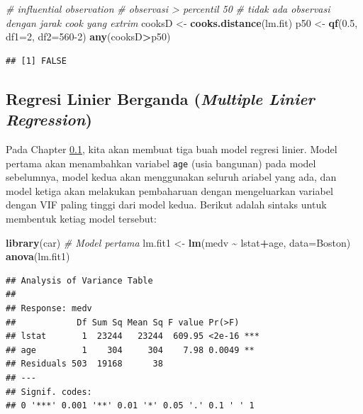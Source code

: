 \documentclass[
]{book}
\newenvironment{Shaded}{\begin{snugshade}}{\end{snugshade}}
\newcommand{\AttributeTok}[1]{\textcolor[rgb]{0.13,0.29,0.53}{#1}}
\newcommand{\CommentTok}[1]{\textcolor[rgb]{0.56,0.35,0.01}{\textit{#1}}}
\newcommand{\DecValTok}[1]{\textcolor[rgb]{0.00,0.00,0.81}{#1}}
\newcommand{\FloatTok}[1]{\textcolor[rgb]{0.00,0.00,0.81}{#1}}
\newcommand{\FunctionTok}[1]{\textcolor[rgb]{0.13,0.29,0.53}{\textbf{#1}}}
\newcommand{\NormalTok}[1]{#1}
\newcommand{\OtherTok}[1]{\textcolor[rgb]{0.56,0.35,0.01}{#1}}
\newcommand{\SpecialCharTok}[1]{\textcolor[rgb]{0.81,0.36,0.00}{\textbf{#1}}}
\theoremstyle{definition}
\theoremstyle{definition}
\theoremstyle{definition}
\theoremstyle{definition}
\theoremstyle{remark}
\begin{document}
\begin{Shaded}
\begin{Highlighting}[]
\CommentTok{\# influential observation}
\CommentTok{\# observasi \textgreater{} percentil 50}
\CommentTok{\# tidak ada observasi dengan jarak cook yang extrim}
\NormalTok{cooksD }\OtherTok{\textless{}{-}} \FunctionTok{cooks.distance}\NormalTok{(lm.fit)}
\NormalTok{p50 }\OtherTok{\textless{}{-}} \FunctionTok{qf}\NormalTok{(}\FloatTok{0.5}\NormalTok{, }\AttributeTok{df1=}\DecValTok{2}\NormalTok{, }\AttributeTok{df2=}\DecValTok{560{-}2}\NormalTok{)}
\FunctionTok{any}\NormalTok{(cooksD}\SpecialCharTok{\textgreater{}}\NormalTok{p50)}
\end{Highlighting}
\end{Shaded}

\begin{verbatim}
## [1] FALSE
\end{verbatim}

\hypertarget{MLR}{%
\subsection{\texorpdfstring{Regresi Linier Berganda (\emph{Multiple Linier Regression})}{Regresi Linier Berganda (Multiple Linier Regression)}}\label{MLR}}

Pada Chapter \ref{MLR}, kita akan membuat tiga buah model regresi linier. Model pertama akan menambahkan variabel \texttt{age} (usia bangunan) pada model sebelumnya, model kedua akan menggunakan seluruh ariabel yang ada, dan model ketiga akan melakukan pembaharuan dengan mengeluarkan variabel dengan VIF paling tinggi dari model kedua. Berikut adalah sintaks untuk membentuk ketiag model tersebut:

\begin{Shaded}
\begin{Highlighting}[]
\FunctionTok{library}\NormalTok{(car)}
\CommentTok{\# Model pertama}
\NormalTok{lm.fit1 }\OtherTok{\textless{}{-}} \FunctionTok{lm}\NormalTok{(medv }\SpecialCharTok{\textasciitilde{}}\NormalTok{ lstat}\SpecialCharTok{+}\NormalTok{age, }\AttributeTok{data=}\NormalTok{Boston)}
\FunctionTok{anova}\NormalTok{(lm.fit1)}
\end{Highlighting}
\end{Shaded}

\begin{verbatim}
## Analysis of Variance Table
## 
## Response: medv
##            Df Sum Sq Mean Sq F value Pr(>F)    
## lstat       1  23244   23244  609.95 <2e-16 ***
## age         1    304     304    7.98 0.0049 ** 
## Residuals 503  19168      38                   
## ---
## Signif. codes:  
## 0 '***' 0.001 '**' 0.01 '*' 0.05 '.' 0.1 ' ' 1
\end{verbatim}
\end{document}
